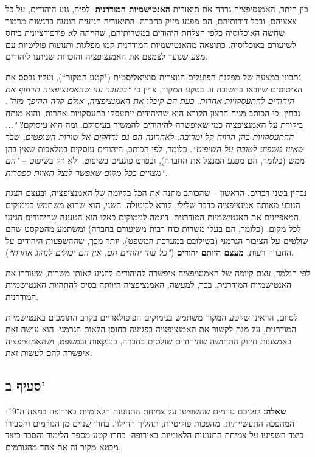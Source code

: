\documentclass[]{article}
\newcommand\bs    {\blacksquare}
\begin{document}
		בין היתר, האמנסיפציה גררה את תיאורית \textbf{האנטישמיות המודרנית}. לפיה, גזע היהודים, על כל צאציהם, ובכל דורותיהם, הם מפגע מזיק בחברה. התיאוריה הגזעית הונעה ברגשות מרמור שחשה האוכלוסיה כלפי הצלחת היהודים במשרותיהם, שהייתה לא פורפורציונית ביחס לשיעורם באוכלוסיה. כתוצאה מהאנטישמיות המודרנית קמו מפלגות ותנועות פוליטיות עם מצע שנועד לצמצם את האמנציפציה והזכויות שניתנו ליהודים. 
		
		נתבונן במצעהּ של מפלגת הפועלים הנוצרית־סוציאליסטית ("קטע המקור``), ועליו נבסס את הציטוטים שיובאו בתשובה זו. בטקע המקור, צויין כי \textit{``בבעבר ענו שהאמנציפציה תדחוף את היהודים להתעסקויות אחרות. כעת הם קיבלו את האמנציפציה, אולם קרה ההיפך מזה"}. נבחין, כי הכותב מניח הרצון הקורא הוא שהיהודים ייתעסקו בתעסקויות אחרות, והוא מותח ביקורת על האמנציפציה כמי שאיפשרה להיהודים להמשיך בעיסוקם. ומה הוא עיסוקם? \textit{"... ההתעסקויות בהן הרווח קל ומרובה. לאחרונה הם גם נדחקים אל שורות השופטים, שבר שאינו משפיע לטובה על השיפוט``}. כלומר, לפי הכותב, היהודים עוסקים במלאכות שאין בהן ממש (כלומר, הם מפגע המנצל את החברה), ובפרט פוגעים בשיפוט. ולא רק בשיפוט – \textit{"הם מצויים בכל מקום שאפשר לנצל תאוות ספסרות``}. 
		
		נבחין בשני דברים. הראשון – שהכותב מתנה את הכל בקיומה של האמנציפציה, ובעצם הצגת הנובע מאותה אמנציפציה כדבר שלילי, קורא לביטולה. השני, הוא שהוא משתמש בנימוקים המאפיינים את האנטישמיות המודרנית. דוגמה לנימוקים כאלו הוא הטענה שהיהודים הגיעו לכל מקום, (כלומר, הם בעלי משרות כוח רבות משיעורם בחברה) ומשתמע מהטקסט ש\textbf{הם שולטים על הציבור הגרמני} (בשילובם במערכת המשפט). יותר מכך, שההשפעות היהודים על החברה רעות, \textbf{מעצם היותם יהודים} (\textit{"כל עוד יהודים הם, אין הם יכולים לנהוג אחרת``}).
		
		לפי הנלמד, עצם קיומה של האמנציפציה איפשרה להיהודים להגיע לאותן משרות, שעוררו את האנטישמיות המודרנית. בכך, למעשה, האמנציפציה היוותה בסיס להתהוות האנטישמיות המודרנית. 
		
		לסיום, הראינו שקטע המקור משתמש בנימוקים הפופולאריים בקרב התומכים באנטישמיות המודרנית, על מנת לקשור את האמנציפציה בפגיעה בחוסן הלאום הגרמני. הוא עושה זאת באמצעות חיזוק התחושה שהיהודים שולטים בחברה, בבנקאות ובמשפט, ושהאמנציפציה איפשרה להם לעשות זאת. \hfill \bs
		
	\subsection*{סעיף ב'}
		\textbf{שאלה: }לפניכם גורמים שהשפיעו על צמיחת התנועות הלאומיות באירופה במאה ה־19: המהפכה התעשייתית, מהפכות פוליטיות, תהליך החילון. בחרו שניים מן הגורמים והסבירו כיצד השפיעו על צמיחת התנועות הלאומיות באירופה. בחרו קטע מספר הלימוד והסבר כיצד מבטא מקור זה את אחד מהגורמים. 
		
\end{document}
